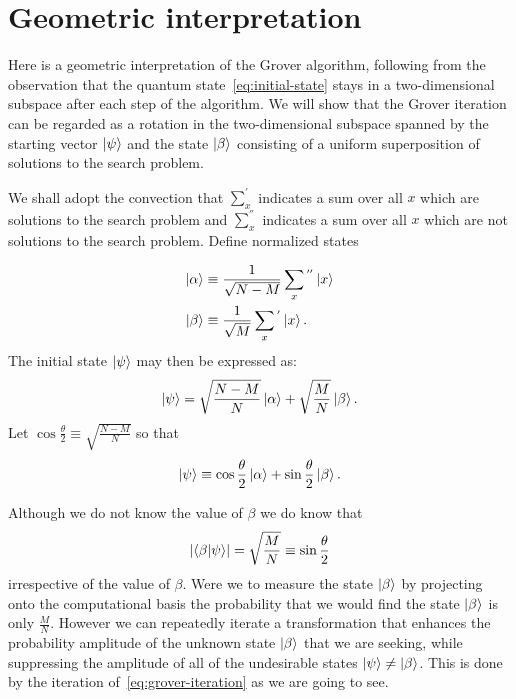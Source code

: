 \section{Geometric interpretation}\label{sec:geometric-interpretation}
Here is a geometric interpretation of the Grover algorithm, following from the observation that the quantum state~\ref{eq:initial-state} stays in a two-dimensional subspace after each step of the algorithm. We will show that the Grover iteration can be regarded as a rotation in the two-dimensional subspace spanned by the starting vector $\ket{\psi}$ and the state $\ket{\beta}$ consisting of a uniform superposition of solutions to the search problem. 

We shall adopt the convection that $\sum_{x}^{'}$ indicates a sum over all $x$ which are solutions to the search problem and $\sum_{x}^{''}$ indicates a sum over all $x$ which are not solutions to the search problem. Define normalized states

\begin{equation*}
\begin{split}
 \ket{\alpha} &\equiv \frac{1}{\sqrt{N-M}} \sum_{x}{}^{''} \ket{x} \\
 \ket{\beta} &\equiv \frac{1}{\sqrt{M}} \sum_{x}{}^{'} \ket{x}.
\end{split}
\end{equation*}
The initial state $\ket{\psi}$ may then be expressed as:
\begin{equation*}
    \ket{\psi} = \sqrt{\frac{N-M}{N}} \ket{\alpha} + \sqrt{\frac{M}{N}} \ket{\beta}.
\end{equation*}
 Let $\cos\frac{\theta}{2} \equiv \sqrt{\frac{N-M}{N}}$ so that 
 \begin{equation*}
 \ket{\psi} \equiv \cos\frac{\theta}{2}\ket{\alpha} + \sin\frac{\theta}{2}\ket{\beta}.
 \end{equation*}
 
Although we do not know the value of $\beta$ we do know that 
\begin{equation}\label{eq:beta-projection}
    \lvert\braket{\beta | \psi}\rvert = \sqrt{\frac{M}{N}} \equiv \sin\frac{\theta}{2}
\end{equation}
irrespective of the value of $\beta$. Were we to measure the state $\ket{\beta}$ by projecting onto the computational basis the probability that we would find the state $\ket{\beta}$ is only $\frac{M}{N}$.  However we can repeatedly iterate a transformation that enhances the probability amplitude of the unknown state $\ket{\beta}$ that we are seeking, while suppressing the amplitude of all of the
undesirable states $\ket{\psi} \neq \ket{\beta}$. This is done by the iteration of~\ref{eq:grover-iteration} as we are going to see.

